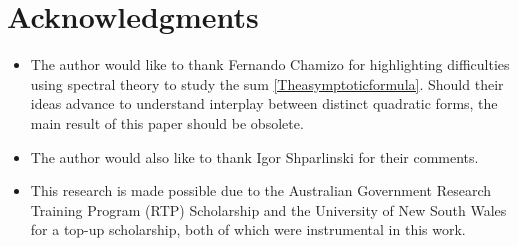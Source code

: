 \documentclass[12pt]{amsart}
\newcommand{\1}{\mathmybb{1}}
\begin{document}
\section{Acknowledgments}
\begin{itemize}
\item The author would like to thank Fernando Chamizo for highlighting difficulties using spectral theory to study the sum \eqref{Theasymptoticformula}. Should their ideas advance to understand interplay between distinct quadratic forms, the main result of this paper should be obsolete. 
\item The author would also like to thank Igor Shparlinski for their comments.
\item This research is made possible due to the Australian Government Research Training Program (RTP) Scholarship and the University of New South Wales for a top-up scholarship, both of which were instrumental in this work.
\end{itemize}
\end{document}
